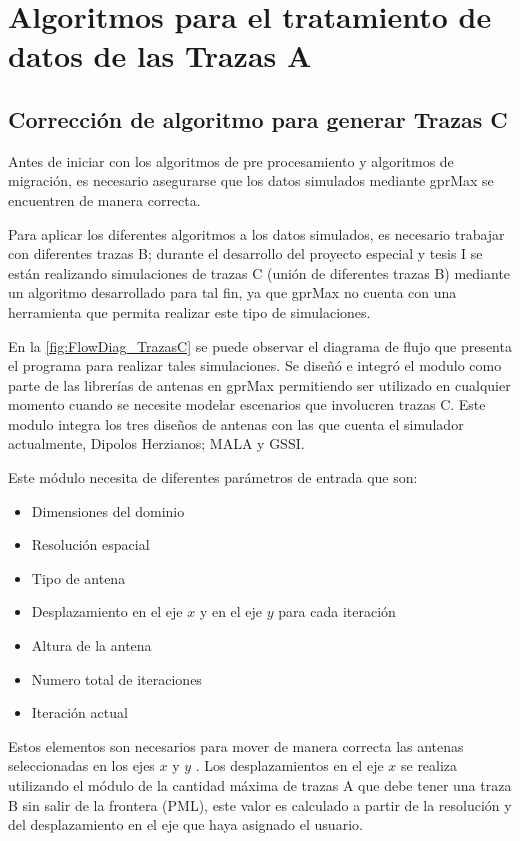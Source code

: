 
\section{Algoritmos para el tratamiento de datos de las Trazas A}
\subsection{Corrección de algoritmo para generar Trazas C}

Antes de iniciar con los algoritmos de pre procesamiento y algoritmos de migración, es necesario asegurarse que los datos simulados mediante gprMax \cite{gprMax}  se encuentren de manera correcta.

Para aplicar los diferentes algoritmos a los datos simulados, es necesario trabajar con diferentes trazas B; durante el desarrollo del proyecto especial y  tesis I se están realizando simulaciones de trazas C (unión de diferentes trazas B) mediante un algoritmo desarrollado para tal fin, ya que gprMax no cuenta con una herramienta que permita realizar este tipo de simulaciones.

En la \figurename{ \ref{fig:FlowDiag_TrazasC}} se puede observar el diagrama de flujo  que presenta el programa para realizar tales simulaciones. Se  diseñó e integró el modulo como parte de las librerías de antenas en gprMax permitiendo ser utilizado en cualquier momento cuando se necesite modelar escenarios que involucren trazas C. Este modulo integra los tres diseños de antenas con las que cuenta el simulador actualmente, Dipolos Herzianos; MALA y GSSI.

Este módulo necesita de diferentes parámetros de entrada que son:

\begin{itemize}
\item Dimensiones del dominio
\item Resolución espacial
\item Tipo de antena
\item Desplazamiento en el eje \(x\) y en el eje \(y\) para cada iteración
\item Altura de la antena
\item Numero total de iteraciones
\item Iteración actual
\end{itemize}

Estos elementos son necesarios para mover de manera correcta las antenas seleccionadas en los ejes \(x\) y \(y\) .  Los desplazamientos en el eje \(x\) se realiza utilizando el módulo de la cantidad máxima de trazas A que debe tener una traza B sin salir de la frontera (PML), este valor es calculado a partir de la resolución y del desplazamiento en el eje que haya asignado el usuario.
 
